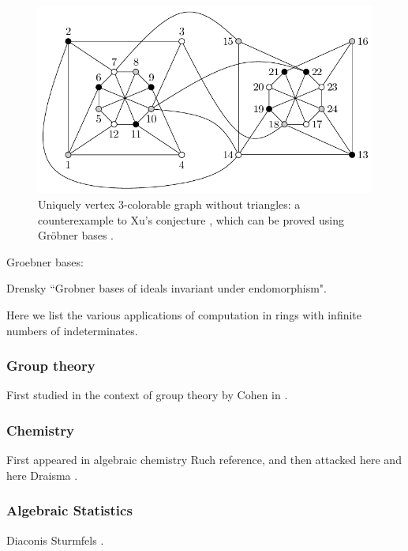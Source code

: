 \begin{figure}
\begin{center}
\includegraphics[width=.8 \linewidth]{akbarigraph.pdf}
\caption{Uniquely vertex 3-colorable graph without triangles: a counterexample \cite{akbari2001kr} to Xu's conjecture \cite{shaoji1990size}, which can be proved using Gr\"obner bases \cite{hillar2008algebraic}.}\label{graph}
\end{center}
\end{figure}



Groebner bases:

Drensky ``Grobner bases of ideals invariant under endomorphism".




Here we list the various applications of computation in rings with infinite numbers of indeterminates.  

\subsubsection{Group theory}

First studied in the context of group theory by Cohen in \cite{cohen1967laws}.

\subsubsection{Chemistry}

First appeared in algebraic chemistry \cite{} Ruch reference, and then attacked here \cite{aschenbrenner2007finite} and here Draisma \cite{Draisma08b}.

\subsubsection{Algebraic Statistics}

Diaconis Sturmfels \cite{diaconis1998algebraic}.

